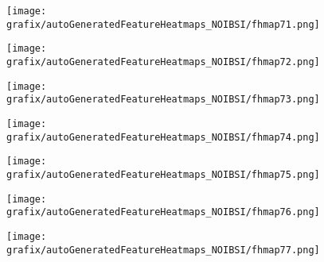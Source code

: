 \begin{subfigure}{\wid\textwidth} 
    \centering 
    \caption{\tiny \sffamily {}} 
    \vspace{\vsp} 
    \texttt{[image: grafix/autoGeneratedFeatureHeatmaps\_NOIBSI/fhmap71.png]} 
\end{subfigure} 
\hspace{\hsp} 
\begin{subfigure}{\wid\textwidth} 
    \centering 
    \caption{\tiny \sffamily {}} 
    \vspace{\vsp} 
    \texttt{[image: grafix/autoGeneratedFeatureHeatmaps\_NOIBSI/fhmap72.png]} 
\end{subfigure} 
\hspace{\hsp} 
\begin{subfigure}{\wid\textwidth} 
    \centering 
    \caption{\tiny \sffamily {}} 
    \vspace{\vsp} 
    \texttt{[image: grafix/autoGeneratedFeatureHeatmaps\_NOIBSI/fhmap73.png]} 
\end{subfigure} 
\hspace{\hsp} 
\begin{subfigure}{\wid\textwidth} 
    \centering 
    \caption{\tiny \sffamily {}} 
    \vspace{\vsp} 
    \texttt{[image: grafix/autoGeneratedFeatureHeatmaps\_NOIBSI/fhmap74.png]} 
\end{subfigure} 
\hspace{\hsp} 
\begin{subfigure}{\wid\textwidth} 
    \centering 
    \caption{\tiny \sffamily {}} 
    \vspace{\vsp} 
    \texttt{[image: grafix/autoGeneratedFeatureHeatmaps\_NOIBSI/fhmap75.png]} 
\end{subfigure} 
\hspace{\hsp} 
\begin{subfigure}{\wid\textwidth} 
    \centering 
    \caption{\tiny \sffamily {}} 
    \vspace{\vsp} 
    \texttt{[image: grafix/autoGeneratedFeatureHeatmaps\_NOIBSI/fhmap76.png]} 
\end{subfigure} 
\hspace{\hsp} 
\begin{subfigure}{\wid\textwidth} 
    \centering 
    \caption{\tiny \sffamily {}} 
    \vspace{\vsp} 
    \texttt{[image: grafix/autoGeneratedFeatureHeatmaps\_NOIBSI/fhmap77.png]} 
\end{subfigure} 
